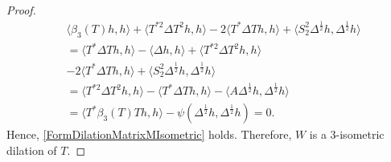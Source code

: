 \documentclass[10pt,a4paper]{amsart}
\begin{document}
\begin{proof}
    \begin{align*}
        &\langle \beta_{3}(T)h,h\rangle + \langle T^{\ast 2}\Delta T^{2}h,h\rangle -2\langle T^{\ast}\Delta Th,h\rangle + \langle S_{2}^{2}\Delta^{\frac{1}{2}}h,\Delta^{\frac{1}{2}}h\rangle\\
        &=\langle T^{\ast}\Delta Th,h\rangle - \langle \Delta h,h\rangle + \langle T^{\ast 2}\Delta T^{2}h,h\rangle\\ &-2\langle T^{\ast}\Delta Th,h\rangle + \langle S_{2}^{2}\Delta^{\frac{1}{2}}h,\Delta^{\frac{1}{2}}h\rangle\\
        &=\langle T^{\ast 2}\Delta T^{2}h,h\rangle - \langle T^{\ast}\Delta Th,h\rangle -\langle A\Delta^{\frac{1}{2}}h,\Delta^{\frac{1}{2}}h\rangle\\
        &=\langle T^{\ast}\beta_{3}(T)Th,h\rangle - \psi(\Delta^{\frac{1}{2}}h,\Delta^{\frac{1}{2}}h) = 0.
    \end{align*}
    Hence, \eqref{FormDilationMatrixMIsometric} holds. Therefore, $ W $ is a 3-isometric dilation of $ T $.
\end{proof}
\end{document}
